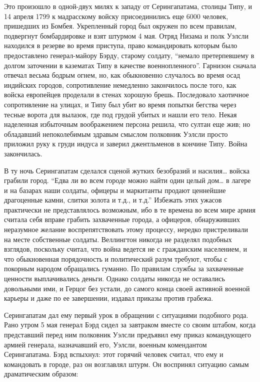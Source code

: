 \documentclass[
  oneside,
  12pt,
  titlepage]{book}
\begin{document}
Это произошло в одной-двух милях к западу от Серингапатама, столицы Типу, и 14 апреля 1799 к мадрасскому войску присоединились еще 6000 человек, пришедших из Бомбея. Укрепленный город был окружен по всем правилам, подвергнут бомбардировке и взят штурмом 4 мая. Отряд Низама и полк Уэлсли находился в резерве во время приступа, право командировать которым было предоставлено генерал-майору Бэрду, старому солдату, ``немало претерпевшему в долгом заточении в казематах Типу в качестве военнопленного''. Гарнизон сначала отвечал весьма бодрым огнем, но, как обыкновенно случалось во время осад индийских городов, сопротивление немедленно закончилось после того, как войска европейцев проделали в стенах хорошую брешь. Последовало хаотичное сопротивление на улицах, и Типу был убит во время попытки бегства через тесные ворота для вылазок, где под грудой убитых и нашли его тело. Некая наделенная избыточным воображением персона решила, что султан еще жив; но обладавший непоколебимым здравым смыслом полковник Уэлсли просто приложил руку к груди индуса и заверил джентльменов в кончине Типу. Война закончилась.

В ту ночь Серингапатам сделался сценой жутких безобразий и насилия\ldots{} войска грабили город. ``Едва ли во всем городе можно найти один целый дом\ldots{} в лагере и на базарах наши солдаты, офицеры и маркитанты продают ценнейшие драгоценные камни, слитки золота и т.д., и т.д.'' Избежать этих ужасов практически не представлялось возможным, ибо в те времена во всем мире армия считала себя вправе грабить захваченные города, а офицеров, обнаруживших неразумное желание воспрепятствовать этому процессу, нередко пристреливали на месте собственные солдаты. Веллингтон никогда не разделял подобных взглядов, поскольку считал, что война ведется не с гражданским населением, и что обыкновенная порядочность и политический разум требуют, чтобы с покорным народом обращались гуманно. По правилам службы за захваченные ценности выплачивались деньги. Однако солдаты никогда не оставались довольными ими, и Герцог без устали, до самого конца своей активной военной карьеры и даже по ее завершении, издавал приказы против грабежа.

Серингапатам дал ему первый урок в обращении с ситуациями подобного рода. Рано утром 5 мая генерал Бэрд сидел за завтраком вместе со своим штабом, когда представший перед ним полковник Уэлсли предъявил ему приказ командующего армией генерала, назначавший его, Уэлсли, военным комендантом Серингапатама. Бэрд вспыхнул: этот горячий человек считал, что ему и командовать в городе, раз он возглавлял штурм. Он воспринял ситуацию самым драматическим образом:
\end{document}
